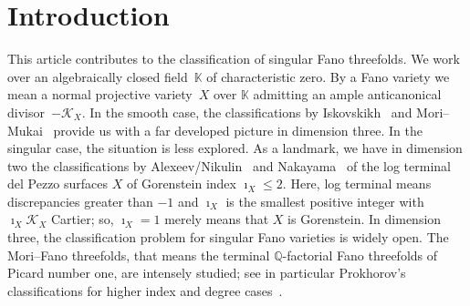 \documentclass[pdftex]{sigma}%
\theoremstyle{definition}
\def\KK{{\mathbb K}}
\def\QQ{{\mathbb Q}}
\numberwithin{equation}{section}
\begin{document}
\allowdisplaybreaks

\newcommand{\arXivNumber}{2108.03029}

\renewcommand{\PaperNumber}{088}

\FirstPageHeading










\section{Introduction}

This article contributes to the classification
of singular Fano threefolds.
We work over an algebraically closed field~$\KK$
of characteristic zero.
By a Fano variety we mean a normal projective
variety~$X$ over $\KK$ admitting an ample
anticanonical divisor~$-\mathcal{K}_X$.
In the smooth case, the classifications by
Iskovskikh~\cite{Is1,Is2} and Mori--Mukai~\cite{MoMu}
provide us with a far developed picture in dimension
three.
In the singular case, the situation is less explored.
As a landmark, we have in dimension two the
classifications by Alexeev/Nikulin~\cite{AlNi}
and Nakayama~\cite{Nak} of the log terminal del Pezzo
surfaces $X$ of Gorenstein index $\imath_X \le 2$.
Here, log terminal means discrepancies greater
than $-1$ and $\imath_X$ is the smallest positive
integer with $\imath_X\mathcal{K}_X$ Cartier;
so, $\imath_X=1$ merely means that $X$ is
Gorenstein.
In dimension three, the classification problem for
singular Fano varieties is widely open.
The Mori--Fano threefolds, that means the terminal
$\QQ$-factorial Fano threefolds of Picard number one,
are intensely studied; see in particular Prokhorov's
classifications for higher index and degree
cases~\cite{Pr1,Pr2,Pr3,Pr4}.
\end{document}
